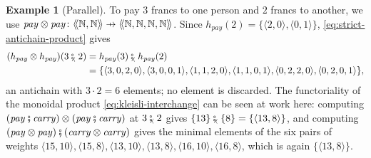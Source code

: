 \documentclass[11pt,a4paper]{article}
\theoremstyle{plain}
\theoremstyle{definition}
\newtheorem{example}[theorem]{Example}
\theoremstyle{remark}
\providecommand{\llangle}{\mathopen{\langle\mkern-3.5mu\langle}}
\providecommand{\rrangle}{\mathclose{\rangle\mkern-3.5mu\rangle}}
\newcommand{\tL}[1]{\llangle #1 \rrangle}
\newcommand{\then}{\mathbin{\fatsemi}}
\newcommand{\tc}{\mathbin{\fatsemi_{\!\scriptscriptstyle\langle}}}
\newcommand{\tup}[1]{\langle #1 \rangle}
\newcommand{\profto}{\mathrel{\ooalign{\hfil$\mapstochar\mkern 5mu$\hfil\cr$\to$\cr}}}
\newcommand{\N}{\mathbb{N}}
\begin{document}
\begin{example}[Parallel]
    \label{exa:coins-parallel}
    To pay $3$ francs to one person and $2$ francs to another, we use $\mathit{pay} \otimes \mathit{pay} \colon \tL{\N,\N} \profto \tL{\N,\N,\N,\N}$.
    Since $h_{\mathit{pay}}(2) = \{ \tup{2,0}, \tup{0,1} \}$, \cref{eq:strict-antichain-product} gives
    \begin{align*}
        (h_{\mathit{pay}} \otimes h_{\mathit{pay}})(3 \tc 2)
        & = h_{\mathit{pay}}(3) \tc h_{\mathit{pay}}(2) \\
        & = \{ \tup{3,0,2,0}, \tup{3,0,0,1}, \tup{1,1,2,0}, \tup{1,1,0,1}, \tup{0,2,2,0}, \tup{0,2,0,1} \},
    \end{align*}
    an antichain with $3 \cdot 2 = 6$ elements; no element is discarded.
    The functoriality of the monoidal product \cref{eq:kleisli-interchange} can be seen at work here: computing $(\mathit{pay} \then \mathit{carry}) \otimes (\mathit{pay} \then \mathit{carry})$ at $3 \tc 2$ gives $\{13\} \tc \{8\} = \{ \tup{13,8} \}$, and computing $(\mathit{pay} \otimes \mathit{pay}) \then (\mathit{carry} \otimes \mathit{carry})$ gives the minimal elements of the six pairs of weights $\tup{15,10}, \tup{15,8}, \tup{13,10}, \tup{13,8}, \tup{16,10}, \tup{16,8}$, which is again $\{ \tup{13,8} \}$.
\end{example}
\end{document}
